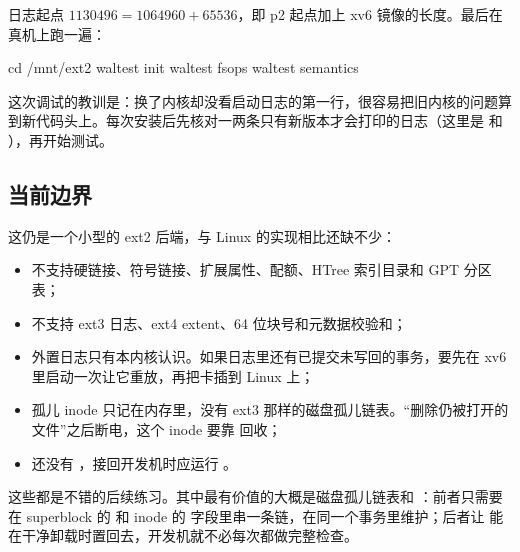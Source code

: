 日志起点 $1130496 = 1064960 + 65536$，即 p2 起点加上 xv6 镜像的长度。最后在真机上跑一遍：

\begin{shcode}
cd /mnt/ext2
waltest init
waltest fsops
waltest semantics
\end{shcode}

这次调试的教训是：换了内核却没看启动日志的第一行，很容易把旧内核的问题算到新代码头上。每次安装后先核对一两条只有新版本才会打印的日志（这里是  和 ），再开始测试。

\subsection{当前边界}

这仍是一个小型的 ext2 后端，与 Linux 的实现相比还缺不少：

\begin{itemize}
  \item 不支持硬链接、符号链接、扩展属性、配额、HTree 索引目录和 GPT 分区表；
  \item 不支持 ext3 日志、ext4 extent、64 位块号和元数据校验和；
  \item 外置日志只有本内核认识。如果日志里还有已提交未写回的事务，要先在 xv6 里启动一次让它重放，再把卡插到 Linux 上；
  \item 孤儿 inode 只记在内存里，没有 ext3 那样的磁盘孤儿链表。“删除仍被打开的文件”之后断电，这个 inode 要靠  回收；
  \item 还没有 ，接回开发机时应运行 。
\end{itemize}

这些都是不错的后续练习。其中最有价值的大概是磁盘孤儿链表和 ：前者只需要在 superblock 的  和 inode 的  字段里串一条链，在同一个事务里维护；后者让  能在干净卸载时置回去，开发机就不必每次都做完整检查。
